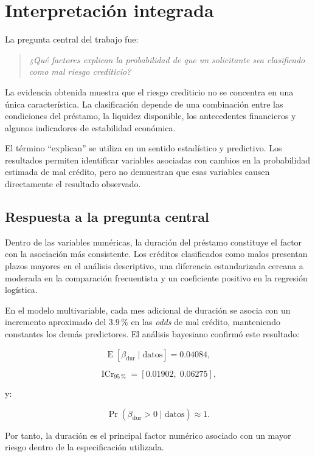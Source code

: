 \section{Interpretación integrada}
\label{sec:interpretacion-integrada}

La pregunta central del trabajo fue:

\begin{quote}
    \itshape
    ¿Qué factores explican la probabilidad de que un solicitante sea
    clasificado como mal riesgo crediticio?
\end{quote}

La evidencia obtenida muestra que el riesgo crediticio no se concentra
en una única característica. La clasificación depende de una combinación
entre las condiciones del préstamo, la liquidez disponible, los
antecedentes financieros y algunos indicadores de estabilidad económica.

El término ``explican'' se utiliza en un sentido estadístico y
predictivo. Los resultados permiten identificar variables asociadas con
cambios en la probabilidad estimada de mal crédito, pero no demuestran
que esas variables causen directamente el resultado observado.

\subsection{Respuesta a la pregunta central}

Dentro de las variables numéricas, la duración del préstamo constituye
el factor con la asociación más consistente. Los créditos clasificados
como malos presentan plazos mayores en el análisis descriptivo, una
diferencia estandarizada cercana a moderada en la comparación
frecuentista y un coeficiente positivo en la regresión logística.

En el modelo multivariable, cada mes adicional de duración se asocia con
un incremento aproximado del \(3.9\,\%\) en las \textit{odds} de mal
crédito, manteniendo constantes los demás predictores. El análisis
bayesiano confirmó este resultado:

\[
\operatorname{E}
\left[
    \beta_{\mathrm{dur}}
    \mid
    \mathrm{datos}
\right]
=
0.04084,
\]

\[
\operatorname{ICr}_{95\,\%}
=
[0.01902,\;0.06275],
\]

y:

\[
\Pr
\left(
    \beta_{\mathrm{dur}}>0
    \mid
    \mathrm{datos}
\right)
\approx
1.
\]

Por tanto, la duración es el principal factor numérico asociado con un
mayor riesgo dentro de la especificación utilizada.

